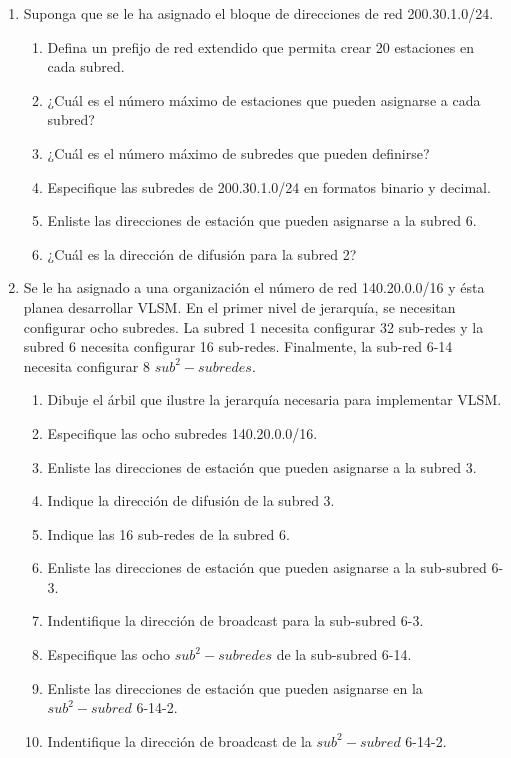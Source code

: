 \begin{enumerate}
    \item Suponga que se le ha asignado el bloque de direcciones de red 200.30.1.0/24.
    \begin{enumerate}
        \item Defina un prefijo de red extendido que permita crear 20 estaciones en cada subred.
        \item ¿Cu\'al es el n\'umero m\'aximo de estaciones que pueden asignarse a cada subred?
        \item ¿Cu\'al es el n\'umero m\'aximo de subredes que pueden definirse?
        \item Especifique las subredes de 200.30.1.0/24 en formatos binario y decimal.
        \item Enliste las direcciones de estaci\'on que pueden asignarse a la subred 6.
        \item ¿Cu\'al es la direcci\'on de difusi\'on para la subred 2?
    \end{enumerate}

    \item Se le ha asignado a una organizaci\'on el n\'umero de red 140.20.0.0/16 y \'esta planea desarrollar VLSM. En el primer nivel de jerarqu\'ia,
    se necesitan configurar ocho subredes. La subred 1 necesita configurar 32 sub-redes y la subred 6 necesita configurar 16 sub-redes. Finalmente, la
    sub-red 6-14 necesita configurar 8 \(sub^2-subredes\).
    \begin{enumerate}
        \item Dibuje el \'arbil que ilustre la jerarqu\'ia necesaria para implementar VLSM.
        \item Especifique las ocho subredes 140.20.0.0/16.
        \item Enliste las direcciones de estaci\'on que pueden asignarse a la subred 3.
        \item Indique la direcci\'on de difusi\'on de la subred 3.
        \item Indique las 16 sub-redes de la subred 6.
        \item Enliste las direcciones de estaci\'on que pueden asignarse a la sub-subred 6-3.
        \item Indentifique la direcci\'on de broadcast para la sub-subred 6-3.
        \item Especifique las ocho \(sub^2-subredes\) de la sub-subred 6-14.
        \item Enliste las direcciones de estaci\'on que pueden asignarse en la \(sub^2-subred\) 6-14-2.
        \item Indentifique la direcci\'on de broadcast de la \(sub^2-subred\) 6-14-2.
    \end{enumerate}


\end{enumerate}
